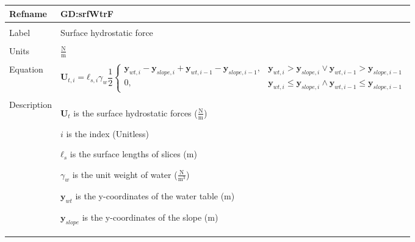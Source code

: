 \documentclass[12pt]{article}
\begin{document}
\noindent \begin{minipage}{\textwidth}
          \begin{tabular}{>{\raggedright}p{}>{\raggedright\arraybackslash}p{}}
          \toprule \textbf{Refname} & \textbf{GD:srfWtrF}
          \label{GD:srfWtrF}
          \\ \midrule \\
          Label & Surface hydrostatic force
          \\ \midrule \\
          Units & $\frac{\text{N}}{\text{m}}$
          \\ \midrule \\
          Equation & \begin{displaymath}
                     {\mathbf{U}_{t,i}}={\mathbf{ℓ}_{s,i}} {γ_{w}} \frac{1}{2} \begin{cases}
                                                                               {\mathbf{y}_{wt,i}}-{\mathbf{y}_{slope,i}}+{\mathbf{y}_{wt,i-1}}-{\mathbf{y}_{slope,i-1}}, & {\mathbf{y}_{wt,i}}>{\mathbf{y}_{slope,i}}\lor{}{\mathbf{y}_{wt,i-1}}>{\mathbf{y}_{slope,i-1}}\\
0, & {\mathbf{y}_{wt,i}}\leq{}{\mathbf{y}_{slope,i}}\land{}{\mathbf{y}_{wt,i-1}}\leq{}{\mathbf{y}_{slope,i-1}}
                                                                               \end{cases}
                     \end{displaymath}
          \\ \midrule \\
          Description & \begin{symbDescription}
                        \item{${\mathbf{U}_{t}}$ is the surface hydrostatic forces ($\frac{\text{N}}{\text{m}}$)}
                        \item{$i$ is the index (Unitless)}
                        \item{${\mathbf{ℓ}_{s}}$ is the surface lengths of slices (m)}
                        \item{${γ_{w}}$ is the unit weight of water ($\frac{\text{N}}{\text{m}^{3}}$)}
                        \item{${\mathbf{y}_{wt}}$ is the y-coordinates of the water table (m)}
                        \item{${\mathbf{y}_{slope}}$ is the y-coordinates of the slope (m)}
                        \end{symbDescription}

\end{tabular}
\end{minipage}
\end{document}
